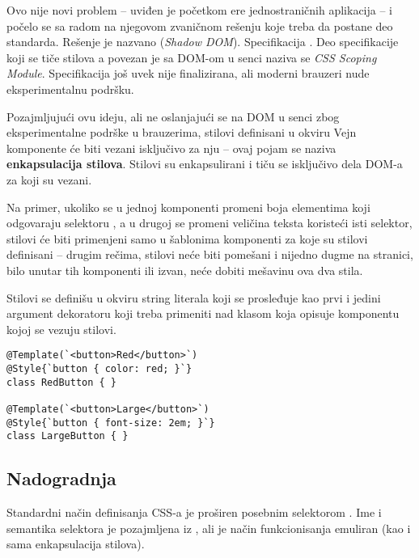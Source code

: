 Ovo nije novi problem -- uviđen je početkom ere jednostraničnih aplikacija -- i počelo se sa radom na njegovom zvaničnom rešenju koje treba da postane deo standarda.
Rešenje je nazvano  (\textsl{Shadow DOM}).
Specifikacija .
Deo specifikacije koji se tiče stilova a povezan je sa DOM-om u senci naziva se \textsl{CSS Scoping Module}.
Specifikacija još uvek nije finalizirana, ali moderni brauzeri nude eksperimentalnu podršku.

Pozajmljujući ovu ideju, ali ne oslanjajući se na DOM u senci zbog eksperimentalne podrške u brauzerima, stilovi definisani u okviru Vejn komponente će biti vezani isključivo za nju -- ovaj pojam se naziva \textbf{enkapsulacija stilova}.
Stilovi su enkapsulirani i tiču se isključivo dela DOM-a za koji su vezani.

Na primer, ukoliko se u jednoj komponenti promeni boja elementima koji odgovaraju selektoru , a u drugoj se promeni veličina teksta koristeći isti selektor, stilovi će biti primenjeni samo u šablonima komponenti za koje su stilovi definisani -- drugim rečima, stilovi neće biti pomešani i nijedno dugme na stranici, bilo unutar tih komponenti ili izvan, neće dobiti mešavinu ova dva stila.

Stilovi se definišu u okviru string literala koji se prosleđuje kao prvi i jedini argument dekoratoru  koji treba primeniti nad klasom koja opisuje komponentu kojoj se vezuju stilovi.

\begin{verbatim}
@Template(`<button>Red</button>`)
@Style{`button { color: red; }`}
class RedButton { }

@Template(`<button>Large</button>`)
@Style{`button { font-size: 2em; }`}
class LargeButton { }
\end{verbatim}

\subsection{Nadogradnja}

Standardni način definisanja CSS-a je proširen posebnim selektorom .
Ime i semantika selektora je pozajmljena iz \cite[\S3.2]{w3c:css-scoping-1}, ali je način funkcionisanja emuliran (kao i sama enkapsulacija stilova).

